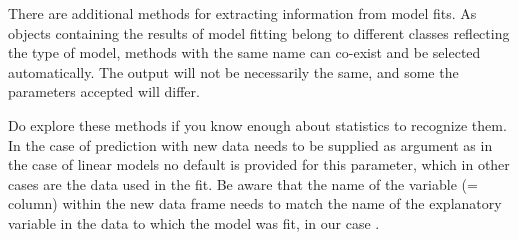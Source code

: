\documentclass[krantz2]{krantz}\usepackage{knitr}%
\begin{document}
\begin{playground}
There are additional methods for extracting information from model fits. As objects containing the results of model fitting belong to different classes reflecting the type of model, methods with the same name can co-exist and be selected automatically. The output will not be necessarily the same, and some the parameters accepted will differ.

\begin{knitrout}\footnotesize
{}\color{fgcolor}\begin{kframe}
\begin{alltt}
\end{alltt}
\end{kframe}
\end{knitrout}

Do explore these methods if you know enough about statistics to recognize them. In the case of prediction with  new data needs to be supplied as argument as in the case of linear models no default is provided for this parameter, which in other cases are the data used in the fit. Be aware that the name of the variable (= column) within the new data frame needs to match the name of the explanatory variable in the data to which the model was fit, in our case .

\begin{knitrout}\footnotesize
{}\color{fgcolor}\begin{kframe}
\begin{alltt}
 \hlkwb{<-} \hlstd{(} \hlstd{=} \hlopt{:}\hlstd{)}
\end{alltt}
\end{kframe}
\end{knitrout}

\begin{knitrout}\footnotesize
{}\color{fgcolor}\begin{kframe}
\begin{alltt}
  
\end{alltt}
\end{kframe}
\end{knitrout}


\end{playground}
\end{document}
